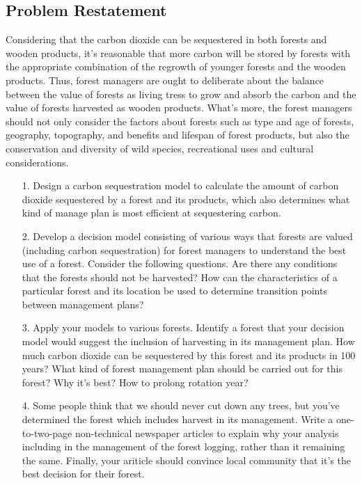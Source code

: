 \documentclass{mcmthesis}
\numberwithin{figure}{section}
\numberwithin{table}{section}
\numberwithin{equation}{section}
\begin{document}
\subsection{Problem Restatement}
Considering that the carbon dioxide can be sequestered in both forests 
and wooden products, it's reasonable that more carbon will be stored by forests with the 
appropriate combination of the regrowth of younger forests and the wooden products.
Thus, forest managers are ought to deliberate about the balance between the value of forests 
as living tress to grow and absorb the carbon and the value of forests harvested as wooden products.
What's more, the forest managers should not only consider the factors about forests such as 
type and age of forests, geography, topography, and benefits and lifespan of forest products,
but also the conservation and diversity of wild species, recreational uses and cultural considerations.
\begin{enumerate}
    \item [1.] Design a carbon sequestration model to calculate the amount of carbon dioxide 
    sequestered by a forest and its products, which also determines what kind of manage plan is
    most efficient at sequestering carbon.
    \item [2.] Develop a decision model consisting of various ways that forests are valued (including
    carbon sequestration) for forest managers to understand the best use of a forest. Consider 
    the following questions. 
    Are there any conditions that the forests should not be harvested?
    How can the characteristics of a particular forest and its location be used 
    to determine transition points between management plans?
    \item [3.] Apply your models to various forests. Identify a forest that your decision model 
    would suggest the inclusion of harvesting in its management plan.
    How much carbon dioxide can be sequestered by this forest and its products in 100 years?
    What kind of forest management plan should be carried out for this forest? Why it's best?
    How to prolong rotation year?

    \item [4.] Some people think that we should never cut down any trees, but you've
    determined the forest which includes harvest in its management. Write a one-to-two-page
    non-technical newspaper articles to explain why your analysis including in the 
    management of the forest logging, rather than it remaining the same. Finally, your ariticle 
    should convince local community that it's the best decision for their forest.
\end{enumerate}
\end{document}
